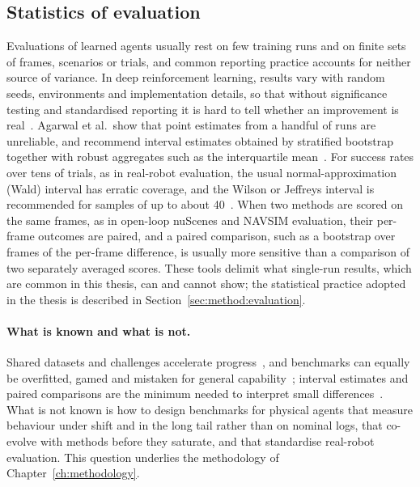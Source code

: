 \subsection{Statistics of evaluation}

Evaluations of learned agents usually rest on few training runs and on finite sets of frames, scenarios or trials, and common reporting practice accounts for neither source of variance. In deep reinforcement learning, results vary with random seeds, environments and implementation details, so that without significance testing and standardised reporting it is hard to tell whether an improvement is real~\cite{henderson2018matters}. Agarwal et al.\ show that point estimates from a handful of runs are unreliable, and recommend interval estimates obtained by stratified bootstrap together with robust aggregates such as the interquartile mean~\cite{agarwal2021precipice}. For success rates over tens of trials, as in real-robot evaluation, the usual normal-approximation (Wald) interval has erratic coverage, and the Wilson or Jeffreys interval is recommended for samples of up to about 40~\cite{brown2001interval}. When two methods are scored on the same frames, as in open-loop nuScenes and NAVSIM evaluation, their per-frame outcomes are paired, and a paired comparison, such as a bootstrap over frames of the per-frame difference, is usually more sensitive than a comparison of two separately averaged scores. These tools delimit what single-run results, which are common in this thesis, can and cannot show; the statistical practice adopted in the thesis is described in Section~\ref{sec:method:evaluation}.

\paragraph{What is known and what is not.} Shared datasets and challenges accelerate progress~\cite{russakovsky2015ilsvrc,donoho2017fifty}, and benchmarks can equally be overfitted, gamed and mistaken for general capability~\cite{recht2019imagenet,dehghani2021benchmark,raji2021everything}; interval estimates and paired comparisons are the minimum needed to interpret small differences~\cite{agarwal2021precipice,brown2001interval}. What is not known is how to design benchmarks for physical agents that measure behaviour under shift and in the long tail rather than on nominal logs, that co-evolve with methods before they saturate, and that standardise real-robot evaluation. This question underlies the methodology of Chapter~\ref{ch:methodology}.

